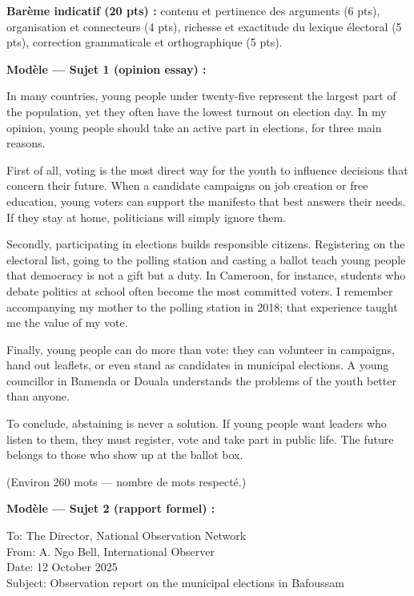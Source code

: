 \documentclass[11pt]{article}
\begin{document}
\begin{corrige}
\textbf{Barème indicatif (20 pts) :} contenu et pertinence des arguments (6 pts), organisation et connecteurs (4 pts), richesse et exactitude du lexique électoral (5 pts), correction grammaticale et orthographique (5 pts).

\textbf{Modèle — Sujet 1 (opinion essay) :}
\begin{textebox}
In many countries, young people under twenty-five represent the largest part of the population, yet they often have the lowest turnout on election day. In my opinion, young people should take an active part in elections, for three main reasons.

First of all, voting is the most direct way for the youth to influence decisions that concern their future. When a candidate campaigns on job creation or free education, young voters can support the manifesto that best answers their needs. If they stay at home, politicians will simply ignore them.

Secondly, participating in elections builds responsible citizens. Registering on the electoral list, going to the polling station and casting a ballot teach young people that democracy is not a gift but a duty. In Cameroon, for instance, students who debate politics at school often become the most committed voters. I remember accompanying my mother to the polling station in 2018; that experience taught me the value of my vote.

Finally, young people can do more than vote: they can volunteer in campaigns, hand out leaflets, or even stand as candidates in municipal elections. A young councillor in Bamenda or Douala understands the problems of the youth better than anyone.

To conclude, abstaining is never a solution. If young people want leaders who listen to them, they must register, vote and take part in public life. The future belongs to those who show up at the ballot box.
\end{textebox}
(Environ 260 mots — nombre de mots respecté.)

\textbf{Modèle — Sujet 2 (rapport formel) :}
\begin{textebox}
To: The Director, National Observation Network\\
From: A. Ngo Bell, International Observer\\
Date: 12 October 2025\\
Subject: Observation report on the municipal elections in Bafoussam


\end{textebox}
\end{corrige}
\end{document}
